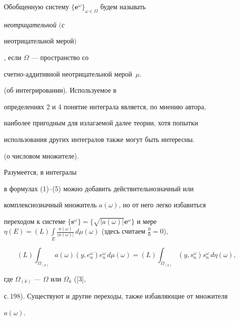 \begin{defn}\hspace{-1.8mm}{\bf.}


Обобщенную систему $\{\boldsymbol e^\omega


\}_{\omega\in\Omega}$ будем называть {\it неотрицательной $($с


неотрицательной мерой$)$}, если $\Omega$ --- пространство со


счетно-аддитивной неотрицательной мерой~$\mu$.


\end{defn}





\begin{note} (об интегрировании). Используемое в


определениях 2 и 4 понятие интеграла является, по мнению автора,


наиболее пригодным для излагаемой далее теории, хотя попытки


использования других интегралов также могут быть интересны.


\end{note}





\begin{note} (о числовом множителе).


Разумеется, в интегралы


в формулах (1)--(5) можно добавить действительнозначный или


комплекснозначный множитель $a(\omega)$, но от него легко избавиться


переходом к системе $\{\boldsymbol s^\omega\}=\{\sqrt{|a(\omega


)|}\boldsymbol e^\omega\}$ и мере $\eta(E)=(L)\int\limits_E\frac


{a(\omega)}{|a(\omega)|}\,d\mu(\omega)$ (здесь считаем $\frac00=0$),


$$


(L)\int_{\Omega_{(k)}}a(\omega)(y,e^\omega_n)e^\omega_n\,


d\mu(\omega)=(L)\int_{\Omega_{(k)}}(y,s^\omega_n)s^\omega_n\,


d\eta(\omega),


$$


где $\Omega_{(k)}$ --- $\Omega$ или $\Omega_k$ ([3],


с.\,198). Существуют и другие переходы, также избавляющие от множителя


$a(\omega)$.


\end{note}





